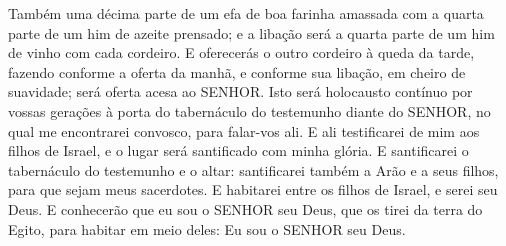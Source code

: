 {{  Também uma décima parte de um efa de boa farinha amassada com a quarta parte de um him de azeite prensado; e a libação será a quarta parte de um him de vinho com cada cordeiro.
  E oferecerás o outro cordeiro à queda da tarde, fazendo conforme a oferta da manhã, e conforme sua libação, em cheiro de suavidade; será oferta acesa ao SENHOR.
  Isto será holocausto contínuo por vossas gerações à porta do tabernáculo do testemunho diante do SENHOR, no qual me encontrarei convosco, para falar-vos ali.
  E ali testificarei de mim aos filhos de Israel, e o lugar será santificado com minha glória. %
  E santificarei o tabernáculo do testemunho e o altar: santificarei também a Arão e a seus filhos, para que sejam meus sacerdotes.
  E habitarei entre os filhos de Israel, e serei seu Deus.
  E conhecerão que eu sou o SENHOR seu Deus, que os tirei da terra do Egito, para habitar em meio deles: Eu sou o SENHOR seu Deus}.
\par }

